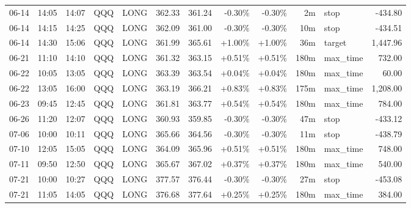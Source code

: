 \documentclass[11pt,a4paper,twoside]{article}
\begin{document}
\begin{center}
\begin{longtable}{>{\color{txtmain}}l l l l l r r r r r >{\color{txtmain}}l r}
06-14 & 14:05 & 14:07 & QQQ & LONG & 362.33 & 361.24 & \textcolor{lossred}{-0.30\%} & \textcolor{lossred}{-0.30\%} & 2m & stop & \textcolor{lossred}{-434.80} \\
06-14 & 14:15 & 14:25 & QQQ & LONG & 362.09 & 361.00 & \textcolor{lossred}{-0.30\%} & \textcolor{lossred}{-0.30\%} & 10m & stop & \textcolor{lossred}{-434.51} \\
06-14 & 14:30 & 15:06 & QQQ & LONG & 361.99 & 365.61 & \textcolor{wingreen}{+1.00\%} & \textcolor{wingreen}{+1.00\%} & 36m & target & \textcolor{wingreen}{1,447.96} \\
06-21 & 11:10 & 14:10 & QQQ & LONG & 361.32 & 363.15 & \textcolor{wingreen}{+0.51\%} & \textcolor{wingreen}{+0.51\%} & 180m & max\_time & \textcolor{wingreen}{732.00} \\
06-22 & 10:05 & 13:05 & QQQ & LONG & 363.39 & 363.54 & \textcolor{wingreen}{+0.04\%} & \textcolor{wingreen}{+0.04\%} & 180m & max\_time & \textcolor{wingreen}{60.00} \\
06-22 & 13:05 & 16:00 & QQQ & LONG & 363.19 & 366.21 & \textcolor{wingreen}{+0.83\%} & \textcolor{wingreen}{+0.83\%} & 175m & max\_time & \textcolor{wingreen}{1,208.00} \\
06-23 & 09:45 & 12:45 & QQQ & LONG & 361.81 & 363.77 & \textcolor{wingreen}{+0.54\%} & \textcolor{wingreen}{+0.54\%} & 180m & max\_time & \textcolor{wingreen}{784.00} \\
06-26 & 11:20 & 12:07 & QQQ & LONG & 360.93 & 359.85 & \textcolor{lossred}{-0.30\%} & \textcolor{lossred}{-0.30\%} & 47m & stop & \textcolor{lossred}{-433.12} \\
07-06 & 10:00 & 10:11 & QQQ & LONG & 365.66 & 364.56 & \textcolor{lossred}{-0.30\%} & \textcolor{lossred}{-0.30\%} & 11m & stop & \textcolor{lossred}{-438.79} \\
07-10 & 12:05 & 15:05 & QQQ & LONG & 364.09 & 365.96 & \textcolor{wingreen}{+0.51\%} & \textcolor{wingreen}{+0.51\%} & 180m & max\_time & \textcolor{wingreen}{748.00} \\
07-11 & 09:50 & 12:50 & QQQ & LONG & 365.67 & 367.02 & \textcolor{wingreen}{+0.37\%} & \textcolor{wingreen}{+0.37\%} & 180m & max\_time & \textcolor{wingreen}{540.00} \\
07-21 & 10:00 & 10:27 & QQQ & LONG & 377.57 & 376.44 & \textcolor{lossred}{-0.30\%} & \textcolor{lossred}{-0.30\%} & 27m & stop & \textcolor{lossred}{-453.08} \\
07-21 & 11:05 & 14:05 & QQQ & LONG & 376.68 & 377.64 & \textcolor{wingreen}{+0.25\%} & \textcolor{wingreen}{+0.25\%} & 180m & max\_time & \textcolor{wingreen}{384.00} \\

\end{longtable}
\end{center}
\end{document}
